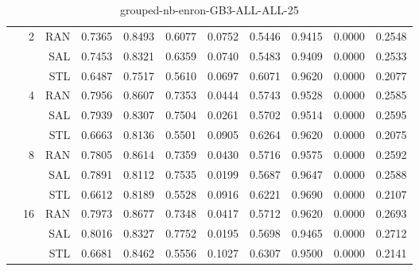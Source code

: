 \begin{center}
\begin{table}[htbp]
\begin{center}
\begin{tabular}{ | r | r | r | r | r | r | r | r | r | r | r |}
 & \multirow{3}{*}{2} & RAN & 0.7365 & 0.8493 & 0.6077 & 0.0752 & 0.5446 & 0.9415 & 0.0000 & 0.2548\\ \cline{3-11}
 &   & SAL & 0.7453 & 0.8321 & 0.6359 & 0.0740 & 0.5483 & 0.9409 & 0.0000 & 0.2533\\ \cline{3-11}
 &   & STL & 0.6487 & 0.7517 & 0.5610 & 0.0697 & 0.6071 & 0.9620 & 0.0000 & 0.2077\\ \cline{2-11}
 & \multirow{3}{*}{4} & RAN & 0.7956 & 0.8607 & 0.7353 & 0.0444 & 0.5743 & 0.9528 & 0.0000 & 0.2585\\ \cline{3-11}
 &   & SAL & 0.7939 & 0.8307 & 0.7504 & 0.0261 & 0.5702 & 0.9514 & 0.0000 & 0.2595\\ \cline{3-11}
 &   & STL & 0.6663 & 0.8136 & 0.5501 & 0.0905 & 0.6264 & 0.9620 & 0.0000 & 0.2075\\ \cline{2-11}
 & \multirow{3}{*}{8} & RAN & 0.7805 & 0.8614 & 0.7359 & 0.0430 & 0.5716 & 0.9575 & 0.0000 & 0.2592\\ \cline{3-11}
 &   & SAL & 0.7891 & 0.8112 & 0.7535 & 0.0199 & 0.5687 & 0.9647 & 0.0000 & 0.2588\\ \cline{3-11}
 &   & STL & 0.6612 & 0.8189 & 0.5528 & 0.0916 & 0.6221 & 0.9690 & 0.0000 & 0.2107\\ \cline{2-11}
 & \multirow{3}{*}{16} & RAN & 0.7973 & 0.8677 & 0.7348 & 0.0417 & 0.5712 & 0.9620 & 0.0000 & 0.2693\\ \cline{3-11}
 &   & SAL & 0.8016 & 0.8327 & 0.7752 & 0.0195 & 0.5698 & 0.9465 & 0.0000 & 0.2712\\ \cline{3-11}
 &   & STL & 0.6681 & 0.8462 & 0.5556 & 0.1027 & 0.6307 & 0.9500 & 0.0000 & 0.2141\\ \cline{2-11}
\hline
\end{tabular}
\caption{grouped-nb-enron-GB3-ALL-ALL-25}
\end{center}
 \end{table}
\end{center}

